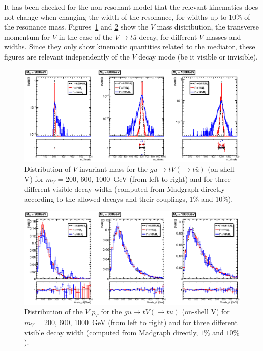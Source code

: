 It has been checked for the non-resonant model that the relevant kinematics 
does not change when changing 
the width of the resonance, for widths up to 10\% of the resonance mass. 
Figures~\ref{fig:appB:Vmass} and \ref{fig:appB:pTV} show 
the $V$ mass distribution, the transverse momentum for $V$ 
in the case of the $V\to t\bar{u}$ decay, for different $V$ masses and widths.
Since they only show kinematic quantities related to the mediator, these figures are relevant independently of the $V$ decay mode (be it visible or invisible). 

\begin{figure}[!h!tpd]
	\centering
	\includegraphics[width=1.0\textwidth]{figures/singletop/m_Vmets}
	\caption{
		Distribution of $V$ invariant mass for the $gu\to tV(\to t\bar{u})$ (on-shell V) 
		for $m_V$ = {200, 600, 1000}~GeV (from left to right) and for three different
		visible decay width (computed from Madgraph directly according to the allowed decays and their couplings, $1\%$ and $10\%$).
	}   
	\label{fig:appB:Vmass}
\end{figure}


\begin{figure}[!h!tpd]
	\centering
	\includegraphics[width=1.0\textwidth]{figures/singletop/Vmets_pt}
	\caption{
		Distribution of the $V$ $p_T$ for the $gu\to tV(\to t\bar{u})$ (on-shell V) for $m_V$ = {200, 600, 1000}~GeV (from left to right) and for three different
		visible decay width (computed from Madgraph directly, $1\%$ and $10\%$).
	}
	\label{fig:appB:pTV}
\end{figure}


